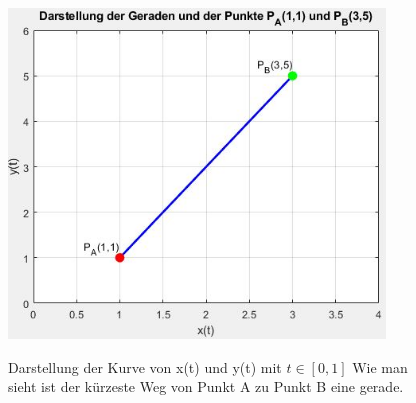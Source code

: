 \begin{figure}
	\centering
	\includegraphics[width=10cm]{papers/geodaeten/Abbildungen/Standardverfahren/Kartesisch}
	\label{geodaeten:figure:Standardverfahren:Kartesisch:figure1}
	\caption{Darstellung der Kurve von x(t) und y(t) mit $t \in [0 , 1]$ Wie man sieht ist der kürzeste Weg von Punkt A zu Punkt B eine gerade.}
\end{figure}

